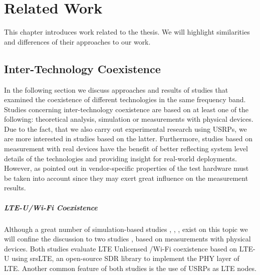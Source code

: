 \chapter{Related Work}
\label{ch:related-work}

This chapter introduces work related to the thesis. We will highlight similarities and differences of their approaches to our work. 

\section{Inter-Technology Coexistence}

In the following section we discuss approaches and results of studies that examined the coexistence of different technologies in the same frequency band. Studies concerning inter-technology coexistence are based on at least one of the following: theoretical analysis, simulation or measurements with physical devices. Due to the fact, that we also carry out experimental research using USRPs, we are more interested in studies based on the latter. Furthermore, studies based on measurement with real devices have the benefit of better reflecting system level details of the technologies and providing insight for real-world deployments. However, as pointed out in \cite{gomezmiguelez16} vendor-specific properties of the test hardware must be taken into account since they may exert great influence on the measurement results. 

\paragraph{LTE-U/Wi-Fi Coexistence}
Although a great number of simulation-based studies \cite{nihtilä13}, \cite{rupasinghe14}, \cite{jeon14}, \cite{cavalcante13} exist on this topic we will confine the discussion to two studies \cite{gomezmiguelez16}, \cite{capretti16} based on measurements with physical devices. Both studies evaluate LTE Unlicensed /Wi-Fi coexistence based on LTE-U using srsLTE, an open-source SDR library to implement the PHY layer of LTE. Another common feature of both studies is the use of USRPs as LTE nodes. 

